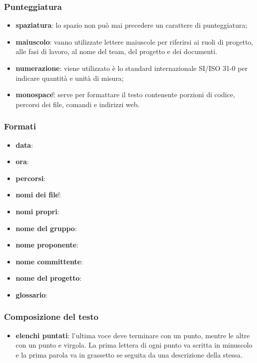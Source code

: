 \subsubsection{Punteggiatura}
\begin{itemize}
	\item \textbf{spaziatura}: lo spazio non può mai precedere un carattere di punteggiatura; 
	\item \textbf{maiuscolo}: vanno utilizzate lettere maiuscole per riferirsi ai ruoli di progetto, alle fasi di lavoro, al nome del team, del progetto e dei documenti.
	\item \textbf{numerazione}: viene utilizzato è lo standard internazionale SI/ISO 31-0 per indicare quantità e unità di misura;
	\item \textbf{monospace}\G: serve per formattare il testo contenente porzioni di codice, percorsi dei file, comandi e indirizzi web.
\end{itemize}

\subsubsection{Formati}
\begin{itemize}
	\item \textbf{data}:
	\item \textbf{ora}:
	\item \textbf{percorsi}:
	\item \textbf{nomi dei file}\G:
	\item \textbf{nomi propri}:
	\item \textbf{nome del gruppo}:
	\item \textbf{nome proponente}:
	\item \textbf{nome committente}:
	\item \textbf{nome del progetto}:
	\item \textbf{glossario}:
\end{itemize}

\subsubsection{Composizione del testo}
\begin{itemize}
	\item \textbf{elenchi puntati}: l'ultima voce deve terminare con un punto, mentre le altre con un punto e virgola. La prima lettera di ogni punto va scritta in minuscolo e la prima parola va in grassetto se seguita da una descrizione della stessa.
\end{itemize}

